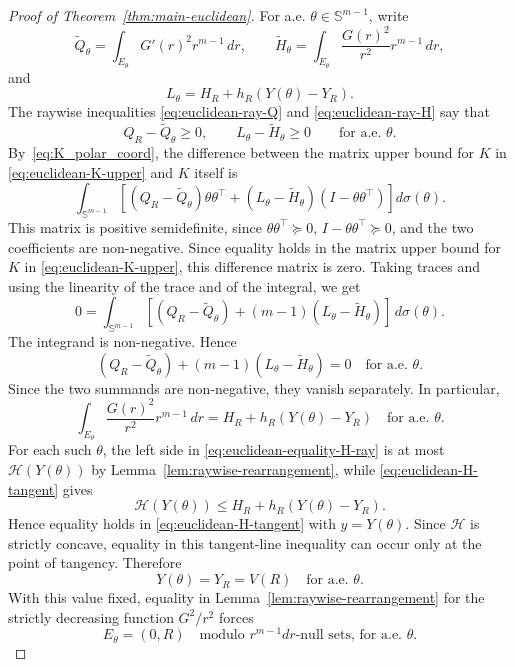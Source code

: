 \documentclass[11pt,letterpaper,reqno]{amsart}
\theoremstyle{definition}
\newcommand{\Sph}{\mathbb S}
\begin{document}
\begin{proof}[Proof of Theorem~\ref{thm:main-euclidean}]
For a.e. \(\theta\in\Sph^{m-1}\), write
\[
        \widetilde Q_\theta
        =
        \int_{E_\theta}G'(r)^2r^{m-1}\,dr,
        \qquad
        \widetilde H_\theta
        =
        \int_{E_\theta}\frac{G(r)^2}{r^2}r^{m-1}\,dr,
\]
and
\[
        L_\theta=H_R+h_R(Y(\theta)-Y_R).
\]
The raywise inequalities \eqref{eq:euclidean-ray-Q} and
\eqref{eq:euclidean-ray-H} say that
\[
        Q_R-\widetilde Q_\theta\geq0,
        \qquad
        L_\theta-\widetilde H_\theta\geq0
        \qquad\text{for a.e. }\theta.
\]
By~\eqref{eq:K_polar_coord}, the difference between the matrix upper bound for \(K\) in \eqref{eq:euclidean-K-upper} and \(K\) itself is
\[
        \int_{\Sph^{m-1}}
        \left[
        (Q_R-\widetilde Q_\theta)\theta\theta^\top 
        +
        (L_\theta-\widetilde H_\theta)(I-\theta\theta^\top )
        \right]d\sigma(\theta).
\]
This matrix is positive semidefinite, since
\(\theta\theta^\top \succeq0\), \(I-\theta\theta^\top \succeq0\), and the two
coefficients are non-negative. Since equality holds in the matrix upper
bound for \(K\) in \eqref{eq:euclidean-K-upper}, this difference matrix is zero. Taking traces and using the linearity of the trace and of the integral, we get
\[
        0=
        \int_{\Sph^{m-1}}
        \left[
        (Q_R-\widetilde Q_\theta)
        +(m-1)(L_\theta-\widetilde H_\theta)
        \right]
        \,d\sigma(\theta).
\]
The integrand is non-negative. Hence
\[
        (Q_R-\widetilde Q_\theta)
        +(m-1)(L_\theta-\widetilde H_\theta)=0
        \quad\text{for a.e. }\theta.
\]
Since the two summands are non-negative, they vanish separately. In
particular,
\begin{equation}\label{eq:euclidean-equality-H-ray}
        \int_{E_\theta}\frac{G(r)^2}{r^2}r^{m-1}\,dr
        =
        H_R+h_R(Y(\theta)-Y_R)
        \quad\text{for a.e. }\theta.
\end{equation}
For each such \(\theta\), the left side in \eqref{eq:euclidean-equality-H-ray} is at most \(\mathcal H(Y(\theta))\) by Lemma~\ref{lem:raywise-rearrangement}, while \eqref{eq:euclidean-H-tangent} gives
\[
        \mathcal H(Y(\theta))\leq H_R+h_R(Y(\theta)-Y_R).
\]
Hence equality holds in \eqref{eq:euclidean-H-tangent} with \(y=Y(\theta)\).
Since \(\mathcal H\) is strictly concave, equality in this tangent-line
inequality can occur only at the point of tangency. Therefore
\[
        Y(\theta)=Y_R=V(R)
        \quad\text{for a.e. }\theta.
\]
With this value fixed, equality in
Lemma~\ref{lem:raywise-rearrangement} for the strictly decreasing function \(G^2/r^2\) forces
\[
        E_\theta=(0,R)
        \quad\text{modulo }r^{m-1}dr\text{-null sets, for a.e. }\theta.
\]



\end{proof}
\end{document}
